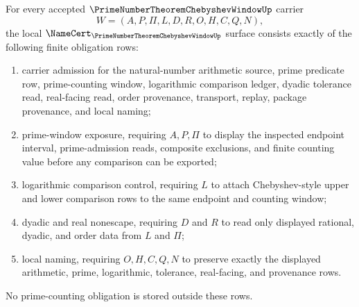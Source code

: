 \begin{theorem}
\label{thm:prime-number-theorem-chebyshev-window-obligations}
For every accepted $\PrimeNumberTheoremChebyshevWindowUp$ carrier
$$
W=(A,P,\Pi,L,D,R,O,H,C,Q,N),
$$
the local $\NameCert_{\PrimeNumberTheoremChebyshevWindowUp}$ surface consists exactly of the following finite obligation rows:
\begin{enumerate}
\item carrier admission for the natural-number arithmetic source, prime predicate row, prime-counting window, logarithmic comparison ledger, dyadic tolerance read, real-facing read, order provenance, transport, replay, package provenance, and local naming;
\item prime-window exposure, requiring $A,P,\Pi$ to display the inspected endpoint interval, prime-admission reads, composite exclusions, and finite counting value before any comparison can be exported;
\item logarithmic comparison control, requiring $L$ to attach Chebyshev-style upper and lower comparison rows to the same endpoint and counting window;
\item dyadic and real nonescape, requiring $D$ and $R$ to read only displayed rational, dyadic, and order data from $L$ and $\Pi$;
\item local naming, requiring $O,H,C,Q,N$ to preserve exactly the displayed arithmetic, prime, logarithmic, tolerance, real-facing, and provenance rows.
\end{enumerate}
No prime-counting obligation is stored outside these rows.
\end{theorem}
